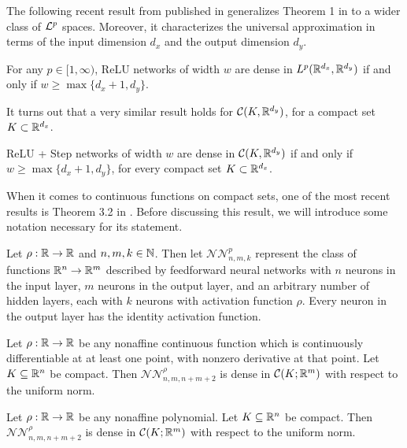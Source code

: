 The following recent result from published in \cite{park_2020_minimum} generalizes Theorem 1 in \cite{lu} to a wider class of ${\mathcal {L}^p}$ spaces. Moreover, it characterizes the universal approximation in terms of the input dimension $d_x$ and the output dimension $d_y$.

\begin{theorem}
For any $p \in [1, \infty)$, ReLU networks of width $w$ are dense in $L^p({\mathbb R}^{d_x}, {\mathbb R}^{d_y})$ if and only if $w \geq \max \{ d_x + 1, d_y \}$.
\end{theorem}
It turns out that a very similar result holds for ${\mathcal C}(K, {\mathbb R}^{d_y})$, for a compact set $K \subset {\mathbb R}^{d_x}$.
\begin{theorem}
 ReLU + Step networks of width $w$ are dense in ${\mathcal C}(K, {\mathbb R}^{d_y})$ if and only if $w \geq \max \{ d_x + 1, d_y \}$, for every compact set $K \subset {\mathbb R}^{d_x}$.
\end{theorem}

When it comes to continuous functions on compact sets, one of the most recent results is Theorem 3.2 in \cite{kidger_2020_universal}.
Before discussing this result, we will introduce some notation necessary for its statement.
\begin{definition}
Let $\rho : {\mathbb R} \to {\mathbb R}$ and $n, m, k \in {\mathbb N}$. Then let $\mathcal{N}\mathcal{N}_{n, m, k}^p$ represent the class of functions ${\mathbb R}^n \to {\mathbb R}^m$ described by feedforward neural networks with $n$ neurons in the input layer, $m$ neurons in the output layer, and an arbitrary number of hidden layers, each with $k$ neurons with activation function $\rho$. Every neuron in the output layer has the identity activation function.
\end{definition}
\begin{theorem}
 Let $\rho : {\mathbb R} \to {\mathbb R}$ be any nonaffine continuous function which is continuously differentiable at at least one point, with nonzero derivative at that point. Let $K \subseteq {\mathbb R}^n$ be compact. Then $\mathcal{N}\mathcal{N}_{n,m,n+m+2}^\rho$ is dense in $\mathcal{C}(K; {\mathbb R}^m)$ with respect to the uniform norm.
\end{theorem}
\begin{proposition}
Let $\rho : {\mathbb R} \to {\mathbb R}$ be any nonaffine polynomial. Let $K \subseteq {\mathbb R}^n$ be compact. Then $\mathcal{N}\mathcal{N}_{n,m,n+m+2}^\rho$ is dense in $\mathcal{C}(K; {\mathbb R}^m)$ with respect to the uniform norm.
\end{proposition}

